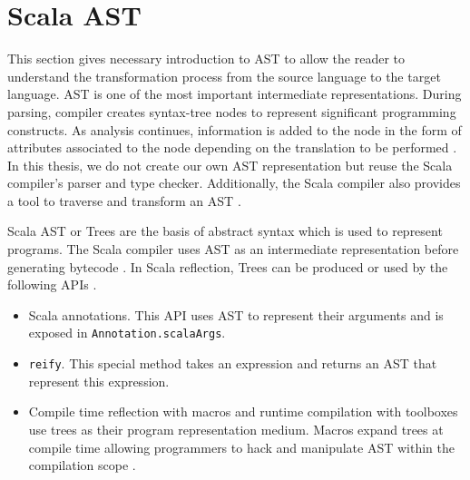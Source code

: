 \section{Scala AST}
This section gives necessary introduction to AST to allow the reader to understand the transformation process from the source language to the target language. AST is one of the most important intermediate representations. During parsing, compiler creates syntax-tree nodes to represent significant programming constructs. As analysis continues, information is added to the node in the form of attributes associated to the node depending on the translation to be performed \cite{lam2006compilers}. In this thesis, we do not create our own AST representation but reuse the Scala compiler's parser and type checker. Additionally, the Scala compiler also provides a tool to traverse and transform an AST \cite{stocker2010scala}. 

Scala AST or Trees are the basis of abstract syntax which is used to represent programs. The Scala compiler uses AST as an intermediate representation before generating bytecode \cite{demarne2014scala}. In Scala reflection, Trees can be produced or used by the following APIs \cite{symboltreestypes}.

\begin{itemize}
\item Scala annotations. This API uses AST to represent their arguments and is exposed in \texttt{Annotation.scalaArgs}. 
\item \texttt{reify}. This special method takes an expression and returns an AST that represent this expression.
\item Compile time reflection with macros \cite{scalamacros} and runtime compilation with toolboxes use trees as their program representation medium. Macros expand trees at compile time allowing programmers to hack and manipulate AST within the compilation scope \cite{burmako2013scala}. 
\end{itemize} 

